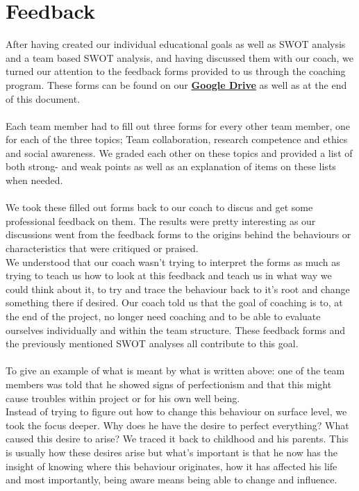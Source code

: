 \documentclass[12pt]{article}
\begin{document}
	\section{Feedback}
	After having created our individual educational goals as well as SWOT analysis and a team based SWOT analysis, and having discussed them with our coach, we turned our attention to the feedback forms provided to us through the coaching program. These forms can be found on our \href{https://drive.google.com/drive/folders/1IJEu7igVdK12MzVx3jkXZMvB5HUXFuYZ?usp=sharing}{\textbf{Google Drive}} as well as at the end of this document.\\
	\\Each team member had to fill out three forms for every other team member, one for each of the three topics; Team collaboration, research competence and ethics and social awareness. We graded each other on these topics and provided a list of both strong- and weak points as well as an explanation of items on these lists when needed.\\
	\\We took these filled out forms back to our coach to discus and get some professional feedback on them. The results were pretty interesting as our discussions went from the feedback forms to the origins behind the behaviours or characteristics that were critiqued or praised.\\
	We understood that our coach wasn't trying to interpret the forms as much as trying to teach us how to look at this feedback and teach us in what way we could think about it, to try and trace the behaviour back to it's root and change something there if desired. Our coach told us that the goal of coaching is to, at the end of the project, no longer need coaching and to be able to evaluate ourselves individually and within the team structure. These feedback forms and the previously mentioned SWOT analyses all contribute to this goal.\\
	\\To give an example of what is meant by what is written above: one of the team members was told that he showed signs of perfectionism and that this might cause troubles within project or for his own well being.\\
	Instead of trying to figure out how to change this behaviour on surface level, we took the focus deeper. Why does he have the desire to perfect everything? What caused this desire to arise? We traced it back to childhood and his parents. This is usually how these desires arise but what's important is that he now has the insight of knowing where this behaviour originates, how it has affected his life and most importantly, being aware means being able to change and influence.
	\newpage
\end{document}
